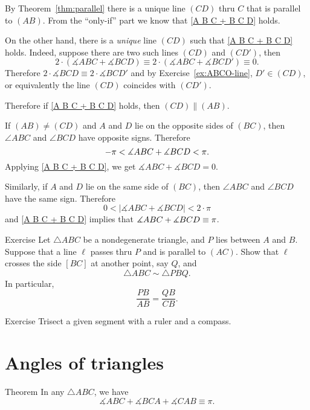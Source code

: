 By Theorem~\ref{thm:parallel} there is a unique line $(CD)$ thru $C$ that is parallel to $(AB)$.
From the ``only-if'' part we know that  \ref{A B C + B C D} holds.

On the other hand, there is a \emph{unique} line $(CD)$ such that \ref{A B C + B C D} holds.
Indeed, suppose there are two such lines $(CD)$ and $(CD')$, then
$$2\cdot(\measuredangle A B C+\measuredangle B C D)\equiv 2\cdot(\measuredangle A B C+\measuredangle B C D')\equiv0.
$$ 
Therefore 
$2\cdot\measuredangle B C D\equiv 2\cdot\measuredangle B C D'$
and by Exercise~\ref{ex:ABCO-line},  $D'\in (CD)$, or equivalently the line $(CD)$ coincides with $(CD')$.

Therefore if \ref{A B C + B C D} holds, then $(CD)\parallel (AB)$.


If $(AB)\ne(C D)$ and $A$ and $D$ lie on the opposite sides of $(BC)$, then $\angle ABC$ and $\angle BCD$ have opposite signs.
Therefore
\[-\pi\z<\measuredangle A B C+\measuredangle B C D<\pi.\]
Applying \ref{A B C + B C D}, we get $\measuredangle A B C+\measuredangle B C D=0$.

Similarly, if $A$ and $D$ lie on the same side of $(BC)$,
then $\angle ABC$ and $\angle BCD$ have the same sign.
Therefore
\[0<|\measuredangle A B C+\measuredangle B C D|<2\cdot\pi\]
and \ref{A B C + B C D} implies that $\measuredangle A B C+\measuredangle B C D\z\equiv\pi$.
\qeds

\begin{thm}{Exercise}\label{ex:smililar+parallel}
Let $\triangle ABC$ be a nondegenerate triangle, and $P$ lies between $A$ and $B$.
Suppose that a line $\ell$ passes thru $P$ and is parallel to $(AC)$.
Show that $\ell$ crosses the side $[BC]$ at another point, say $Q$, and 
\[\triangle ABC\sim\triangle PBQ.\]
In particular, 
\[\frac{PB}{AB}=\frac{QB}{CB}.\]

\end{thm} 

\begin{thm}{Exercise}\label{ex:trisection}
Trisect a given segment with a ruler and a compass.
\end{thm}

\section*{Angles of triangles}

\begin{thm}{Theorem}\label{thm:3sum}
In any $\triangle A B C$, we have
$$\measuredangle A B C+ \measuredangle B C A + \measuredangle C A B \equiv \pi.$$

\end{thm}

